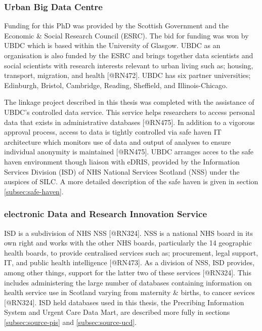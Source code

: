 \documentclass[]{article}
\begin{document}
\subsubsection{Urban Big Data Centre}\label{subsec:ubdc}

Funding for this PhD was provided by the Scottish Government and the
Economic \& Social Research Council (ESRC). The bid for funding was won
by UBDC which is based within the University of Glasgow. UBDC as an
organisation is also funded by the ESRC and brings together data
scientists and social scientists with research interests relevant to
urban living such as; housing, transport, migration, and health
{[}@RN472{]}. UBDC has six partner universities; Edinburgh, Bristol,
Cambridge, Reading, Sheffield, and Illinois-Chicago.

The linkage project described in this thesis was completed with the
assistance of UBDC's controlled data service. This service helps
researchers to access personal data that exists in administrative
databases {[}@RN475{]}. In addition to a vigorous approval process,
access to data is tightly controlled via safe haven IT architecture
which monitors use of data and output of analyses to ensure individual
anonymity is maintained {[}@RN475{]}. UBDC arranges acces to the safe
haven environment though liaison with eDRIS, provided by the Information
Services Division (ISD) of NHS National Services Scotland (NSS) under
the auspices of SILC. A more detailed description of the safe haven is
given in section \ref{subsec:safe-haven}.

\subsubsection{electronic Data and Research Innovation Service}\label{subsec:edris}

ISD is a subdivision of NHS NSS {[}@RN324{]}. NSS is a national NHS
board in its own right and works with the other NHS boards, particularly
the 14 geographic health boards, to provide centralised services such
as; procurement, legal support, IT, and public health intelligence
{[}@RN473{]}. As a division of NSS, ISD provides, among other things,
support for the latter two of these services {[}@RN324{]}. This includes
administering the large number of databases containing information on
health service use in Scotland varying from maternity \& births, to
cancer sevices {[}@RN324{]}. ISD held databases used in this thesis, the
Precribing Information System and Urgent Care Data Mart, are described
more fully in sections \ref{subsec:source-pis} and
\ref{subsec:source-ucd}.
\end{document}

